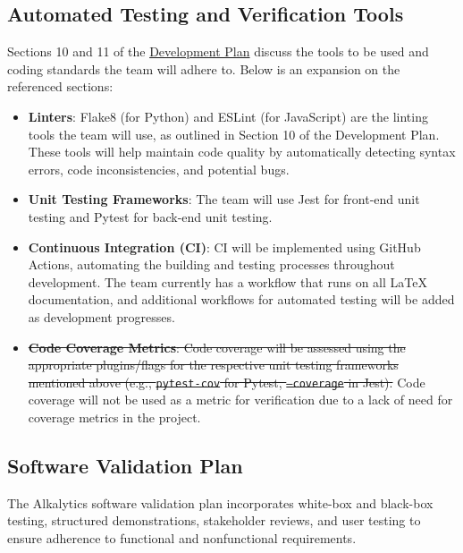 \documentclass[12pt, titlepage]{article}
\begin{document}
\subsection{Automated Testing and Verification Tools} \label{testingTools}
Sections 10 and 11 of the
\href{https://github.com/SumanyaG/Alkalytics/blob/main/docs/DevelopmentPlan/DevelopmentPlan.pdf}{Development
Plan} discuss the tools to be used and coding standards the team will adhere to.
Below is an expansion on the referenced sections:
\begin{itemize}
  \item \textbf{Linters}: Flake8 (for Python) and ESLint (for JavaScript) are
  the linting tools the team will use, as outlined in Section 10 of the
  Development Plan. These tools will help maintain code quality by automatically
  detecting syntax errors, code inconsistencies, and potential bugs.
  \item \textbf{Unit Testing Frameworks}: The team will use Jest for front-end
  unit testing and Pytest for back-end unit testing.
  \item \textbf{Continuous Integration (CI)}: CI will be implemented using
  GitHub Actions, automating the building and testing processes throughout
  development. The team currently has a workflow that runs on all \LaTeX{}
  documentation, and additional workflows for automated testing will be added as
  development progresses. 
  \item \st{\textbf{Code Coverage Metrics}: Code coverage will be assessed using the
  appropriate plugins/flags for the respective unit testing frameworks mentioned
  above (e.g., \texttt{pytest-cov} for Pytest, \texttt{--coverage} in Jest).}
  Code coverage will not be used as a metric for verification due to a
  lack of need for coverage metrics in the project.
\end{itemize}

\subsection{Software Validation Plan}
The Alkalytics software validation plan incorporates white-box and black-box
testing, structured demonstrations, stakeholder reviews, and user testing to
ensure adherence to functional and nonfunctional requirements.
\end{document}
